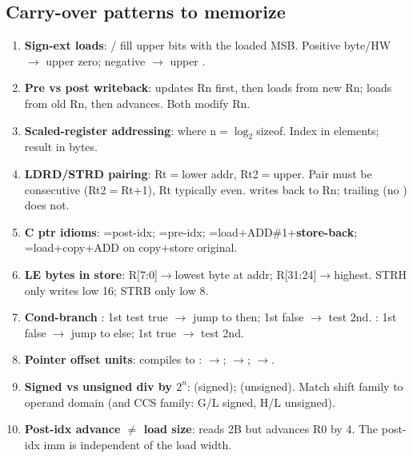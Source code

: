 \subsection{Carry-over patterns to memorize}
\begin{enumerate}
\item \textbf{Sign-ext loads}: / fill upper bits with the loaded MSB. Positive byte/HW $\to$ upper zero; negative $\to$ upper .
\item \textbf{Pre vs post writeback}: \asm{[Rn,\#i]!} updates Rn first, then loads from new Rn;  loads from old Rn, then advances. Both modify Rn.
\item \textbf{Scaled-register addressing}:  where n$=\log_2$sizeof. Index in elements; result in bytes.
\item \textbf{LDRD/STRD pairing}: Rt$=$lower addr, Rt2$=$upper. Pair must be consecutive (Rt2$=$Rt$+$1), Rt typically even. \asm{[Rn,\#i]!} writes back to Rn; trailing  (no \asm{!}) does not.
\item \textbf{C ptr idioms}: =post-idx; =pre-idx; =load+ADD\#1+\textbf{store-back}; =load+copy+ADD on copy+store original.
\item \textbf{LE bytes in store}: R[7:0]$\to$lowest byte at addr; R[31:24]$\to$highest. STRH only writes low 16; STRB only low 8.
\item \textbf{Cond-branch \cee{||}}: 1st test true $\to$ jump to then; 1st false $\to$ test 2nd. \cee{\&\&}: 1st false $\to$ jump to else; 1st true $\to$ test 2nd.
\item \textbf{Pointer offset units}:  compiles to \asm{[Rn,\#k*sizeof(*p)]}: $\to$; $\to$; $\to$.
\item \textbf{Signed vs unsigned div by $2^n$}:  (signed);  (unsigned). Match shift family to operand domain (and CCS family: G/L signed, H/L unsigned).
\item \textbf{Post-idx advance $\neq$ load size}:  reads 2B but advances R0 by 4. The post-idx imm is independent of the load width.
\end{enumerate}
